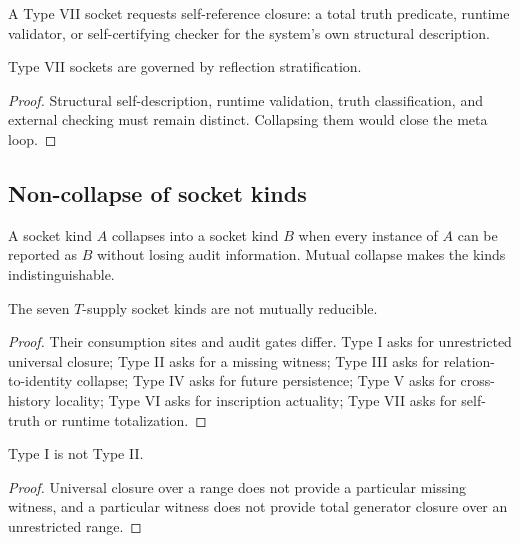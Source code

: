 \begin{definition}
\label{def:philosophy-type-vii-socket}
A Type VII socket requests self-reference closure: a total truth
predicate, runtime validator, or self-certifying checker for the
system's own structural description.
\end{definition}

\begin{theorem}
\label{thm:philosophy-type-vii-gate}
Type VII sockets are governed by reflection stratification.
\end{theorem}
\begin{proof}
Structural self-description, runtime validation, truth classification,
and external checking must remain distinct. Collapsing them would close
the meta loop.
\end{proof}

\subsection{Non-collapse of socket kinds}
\label{subsec:philosophy-socket-non-collapse}

\begin{definition}
\label{def:philosophy-socket-collapse}
A socket kind \(A\) collapses into a socket kind \(B\) when every
instance of \(A\) can be reported as \(B\) without losing audit
information. Mutual collapse makes the kinds indistinguishable.
\end{definition}

\begin{theorem}
\label{thm:philosophy-seven-sockets-do-not-collapse}
The seven \(T\)-supply socket kinds are not mutually reducible.
\end{theorem}
\begin{proof}
Their consumption sites and audit gates differ. Type I asks for
unrestricted universal closure; Type II asks for a missing witness;
Type III asks for relation-to-identity collapse; Type IV asks for
future persistence; Type V asks for cross-history locality; Type VI
asks for inscription actuality; Type VII asks for self-truth or runtime
totalization.
\end{proof}

\begin{corollary}
\label{cor:philosophy-induction-not-choice}
Type I is not Type II.
\end{corollary}
\begin{proof}
Universal closure over a range does not provide a particular missing
witness, and a particular witness does not provide total generator
closure over an unrestricted range.
\end{proof}

